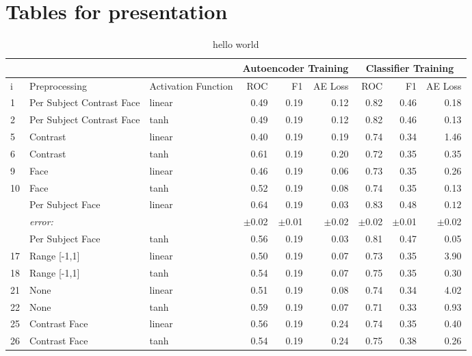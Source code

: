 \chapter{Tables for presentation}
  \begin{table}[!h] {\footnotesize
    \centering
    \begin{tabular}{lllrrrrrr}
          && &   \multicolumn{3}{|c|}{Autoencoder Training} &  \multicolumn{3}{c|}{Classifier Training}    \\
      \hline
       i&Preprocessing    & Activation Function&  ROC&F1&AE Loss & ROC & F1 & AE Loss \\
       \hline
       1&Per Subject Contrast Face & linear &    0.49 &   0.19 &     0.12 &    0.82 &   0.46 &     0.18 \\
       2&Per Subject Contrast Face & tanh   &    0.49 &   0.19 &     0.12 &    0.82 &   0.46 &     0.13 \\
       \hline
       5&Contrast          & linear &    0.40 &   0.19 &     0.19 &    0.74 &   0.34 &     1.46 \\
       6&Contrast          & tanh   &    0.61 &   0.19 &     0.20 &    0.72 &   0.35 &     0.35 \\
       \hline
       9&Face              & linear &    0.46 &   0.19 &     0.06 &    0.73 &   0.35 &     0.26 \\
       10&Face              & tanh   &    0.52 &   0.19 &     0.08 &    0.74 &   0.35 &     0.13 \\
       \hline
       \hdashline
       13&Per Subject Face  & linear &    $0.64$ &   $0.19$ &     $0.03$ &    $0.83$ &   $0.48$ &     $0.12$ \\
       &{\it error:}  &&$\pm$0.02 &$\pm$0.01 &$\pm$0.02  &$\pm$0.02 &$\pm$0.01 &$\pm$0.02 \\
       \hdashline
       14&Per Subject Face  & tanh   &    0.56 &   0.19 &     0.03 &    0.81 &   0.47 &     0.05 \\
       \hline
       17&Range [-1,1]      & linear &    0.50 &   0.19 &     0.07 &    0.73 &   0.35 &     3.90 \\
       18&Range [-1,1]      & tanh   &    0.54 &   0.19 &     0.07 &    0.75 &   0.35 &     0.30 \\
       \hline
       21&None              & linear &    0.51 &   0.19 &     0.08 &    0.74 &   0.34 &     4.02 \\
       22&None              & tanh   &    0.59 &   0.19 &     0.07 &    0.71 &   0.33 &     0.93 \\
       \hline
       25&Contrast Face     & linear &    0.56 &   0.19 &     0.24 &    0.74 &   0.35 &     0.40 \\
       26&Contrast Face     & tanh   &    0.54 &   0.19 &     0.24 &    0.75 &   0.38 &     0.26 \\
       \hline
      \end{tabular}
        \caption{hello world}
    \label{tab:psearch} }
  \end{table}

